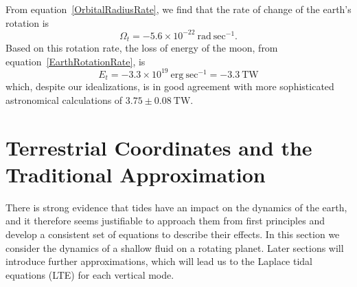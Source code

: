 \documentclass[11pt]{article}
\begin{document}
From equation~\eqref{OrbitalRadiusRate}, we find that the rate of change of the earth's rotation is
\begin{equation*}
\Omega_t = -5.6 \times 10^{-22} \ \textrm{rad} \ \textrm{sec}^{-1}.
\end{equation*}
Based on this rotation rate, the loss of energy of the moon, from equation~\eqref{EarthRotationRate}, is
\begin{equation*}
E_t = -3.3 \times 10^{19} \ \textrm{erg} \ \textrm{sec}^{-1} = -3.3 \ \textrm{TW}
\end{equation*}
which, despite our idealizations, is in good agreement with more sophisticated astronomical calculations of $3.75 \pm 0.08 \ \textrm{TW}$.\cite{Kantha1998}


\section{Terrestrial Coordinates and the Traditional Approximation}

There is strong evidence that tides have an impact on the dynamics of the earth, and it therefore seems justifiable to approach them from first principles and develop a consistent set of equations to describe their effects. In this section we consider the dynamics of a shallow fluid on a rotating planet. Later sections will introduce further approximations, which will lead us to the Laplace tidal equations (LTE) for each vertical mode.
\end{document}
